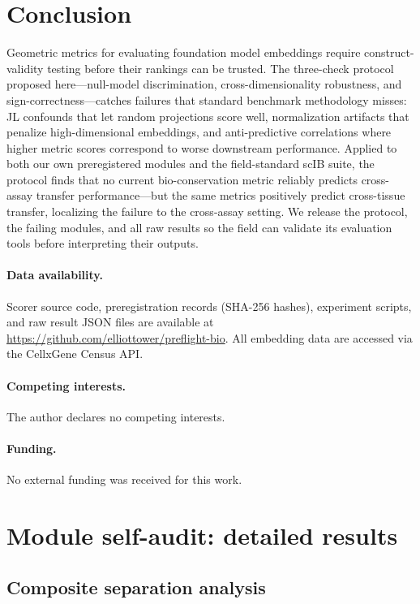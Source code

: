 \documentclass[10pt,letterpaper]{article}
\begin{document}
\section{Conclusion}

Geometric metrics for evaluating foundation model embeddings require construct-validity testing before their rankings can be trusted. The three-check protocol proposed here---null-model discrimination, cross-dimensionality robustness, and sign-correctness---catches failures that standard benchmark methodology misses: JL confounds that let random projections score well, normalization artifacts that penalize high-dimensional embeddings, and anti-predictive correlations where higher metric scores correspond to worse downstream performance. Applied to both our own preregistered modules and the field-standard scIB suite, the protocol finds that no current bio-conservation metric reliably predicts cross-assay transfer performance---but the same metrics positively predict cross-tissue transfer, localizing the failure to the cross-assay setting. We release the protocol, the failing modules, and all raw results so the field can validate its evaluation tools before interpreting their outputs.

\paragraph{Data availability.} Scorer source code, preregistration records (SHA-256 hashes), experiment scripts, and raw result JSON files are available at \url{https://github.com/elliottower/preflight-bio}. All embedding data are accessed via the CellxGene Census API.

\paragraph{Competing interests.} The author declares no competing interests.

\paragraph{Funding.} No external funding was received for this work.


\appendix

\section{Module self-audit: detailed results}
\label{app:modules}

\subsection{Composite separation analysis}
\end{document}
